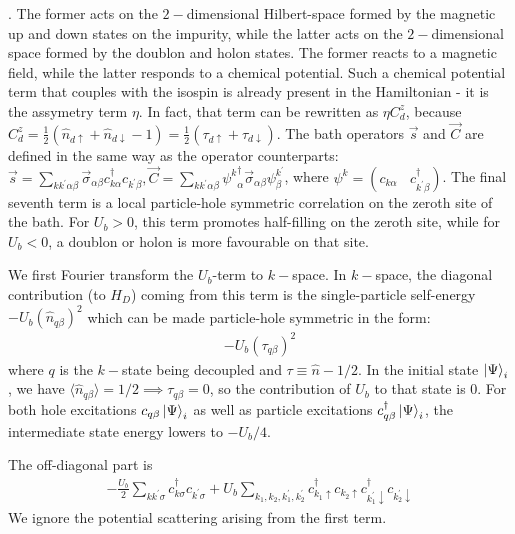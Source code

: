 \documentclass{report}
\numberwithin{equation}{section}
\begin{document}
\begin{appendices}
\cite{anderson1958random,nambu_1960}. The former acts on the \(2-\)dimensional Hilbert-space formed by the magnetic up and down states on the impurity, while the latter acts on the \(2-\)dimensional space formed by the doublon and holon states. The former reacts to a magnetic field, while the latter responds to a chemical potential. Such a chemical potential term that couples with the isospin is already present in the Hamiltonian - it is the assymetry term \(\eta\). In fact, that term can be rewritten as \(\eta C_d^z\), because \(C^z_d = \frac{1}{2}\left(\hat n_{d \uparrow} + \hat n_{d \downarrow} - 1\right) = \frac{1}{2}\left( \tau_{d \uparrow} + \tau_{d \downarrow} \right) \). The bath operators \(\vec s\) and \(\vec C\) are defined in the same way as the operator counterparts: \(\vec s = \sum_{kk^\prime\alpha\beta}\vec \sigma_{\alpha\beta}c^\dagger_{k\alpha}c_{k^\prime\beta}, \vec C = \sum_{kk^\prime\alpha\beta}{\psi^k}^\dagger_\alpha\vec\sigma_{\alpha\beta}\psi^{k^\prime}_\beta\), where \(\psi^k = \left(c_{k\alpha} ~ ~ ~ ~ c^\dagger_{k^\prime\beta}\right) \). The final seventh term is a local particle-hole symmetric correlation on the zeroth site of the bath. For \(U_b>0\), this term promotes half-filling on the zeroth site, while for \(U_b<0\), a doublon or holon is more favourable on that site.

We first Fourier transform the \(U_b\)-term to \(k-\)space. In \(k-\)space, the diagonal contribution (to \(H_D\)) coming from this term is the single-particle self-energy \(-U_b\left(\hat n_{q \beta}\right)^2\) which can be made particle-hole symmetric in the form:
\begin{equation}\begin{aligned}
	-U_b\left(\tau_{q \beta}\right)^2
\end{aligned}\end{equation}
where \(q\) is the \(k-\)state being decoupled and \(\tau \equiv \hat n - 1/2\). In the initial state \(\ket{\Psi}_i\), we have \(\langle \hat n_{q\beta} \rangle = 1/2 \implies \tau_{q\beta} = 0\), so the contribution of \(U_b\) to that state is 0. For both hole excitations \(c_{q\beta}\ket{\Psi}_i\) as well as particle excitations \(c^\dagger_{q\beta}\ket{\Psi}_i\), the intermediate state energy lowers to \(-U_b/4\).

The off-diagonal part is
\begin{equation}\begin{aligned}
	-\frac{U_b}{2}\sum_{kk^\prime\sigma}c^\dagger_{k\sigma}c_{k^\prime\sigma} + U_b \sum_{k_1,k_2,k_1^\prime,k_2^\prime} c^\dagger_{k_1 \uparrow}c_{k_2 \uparrow} c^\dagger_{k^\prime_1 \downarrow}c_{k^\prime_2 \downarrow} 
\end{aligned}\end{equation}
We ignore the potential scattering arising from the first term.


\end{appendices}
\end{document}
